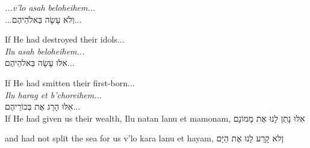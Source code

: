 {\begin{itemize}
{		\textit{...v'lo asah beloheihem...}\\
		\texthebrew{...וְלֹא עָשָׂה בֵּאלֹהֵיהֶם...}\\
		\vspace*{2ex}
		\vspace*{2ex}		
		\raggedright{If He had destroyed their idols...\\
		\textit{Ilu asah beloheihem...}\\
		\texthebrew{אִלּוּ עָשָׂה בֵּאלֹהֵיהֶם...}\\}
		\vspace*{2ex}
		\vspace*{2ex}
		\vspace*{2ex}
		\raggedright{If He had smitten their first-born...\\
		\textit{Ilu harag et b'choreihem...}\\
		\texthebrew{אִלּוּ הָרַג אֶת בְּכוֹרֵיהֶם...}\\}
		\vspace*{2ex}
		\vspace*{2ex}		
		\vspace*{2ex}
		If He had given us their wealth,
		Ilu natan lanu et mamonam,
		\texthebrew{אִלּוּ נָתַן לָנוּ אֶת מָמוֹנָם}
		
		and had not split the sea for us
		v'lo kara lanu et hayam,
		\texthebrew{ןלא קָרַע לָנוּ אֶת הַיָּם}

}
\end{itemize}}
